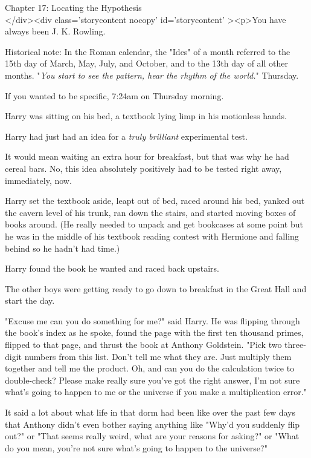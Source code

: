 
Chapter 17: Locating the Hypothesis\\
</div><div  class='storycontent nocopy' id='storycontent' ><p>You have always 
been J. K. Rowling.

Historical note: In the Roman calendar, the "Ides" of a month referred to the 
15th day of March, May, July, and October, and to the 13th day of all other 
months.
\sbreak
"\emph{You start to see the pattern, hear the rhythm of the world.}"
\sbreak
Thursday.

If you wanted to be specific, 7:24am on Thursday morning.

Harry was sitting on his bed, a textbook lying limp in his motionless hands.

Harry had just had an idea for a \emph{truly brilliant} experimental test.

It would mean waiting an extra hour for breakfast, but that was why he had 
cereal bars. No, this idea absolutely positively had to be tested right away, 
immediately, now.

Harry set the textbook aside, leapt out of bed, raced around his bed, yanked 
out the cavern level of his trunk, ran down the stairs, and started moving 
boxes of books around. (He really needed to unpack and get bookcases at some 
point but he was in the middle of his textbook reading contest with Hermione 
and falling behind so he hadn't had time.)

Harry found the book he wanted and raced back upstairs.

The other boys were getting ready to go down to breakfast in the Great Hall and 
start the day.

"Excuse me can you do something for me?" said Harry. He was flipping through 
the book's index as he spoke, found the page with the first ten thousand 
primes, flipped to that page, and thrust the book at Anthony Goldstein. "Pick 
two three-digit numbers from this list. Don't tell me what they are. Just 
multiply them together and tell me the product. Oh, and can you do the 
calculation twice to double-check? Please make really sure you've got the right 
answer, I'm not sure what's going to happen to me or the universe if you make a 
multiplication error."

It said a lot about what life in that dorm had been like over the past few days 
that Anthony didn't even bother saying anything like "Why'd you suddenly flip 
out?" or "That seems really weird, what are your reasons for asking?" or "What 
do you mean, you're not sure what's going to happen to the universe?"

